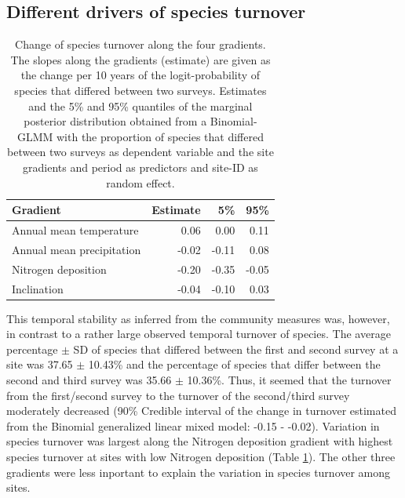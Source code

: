 \documentclass[fleqn,10pt,lineno]{wlpeerj} %
\theoremstyle{definition}
\theoremstyle{definition}
\theoremstyle{definition}
\theoremstyle{remark}
\begin{document}
\subsection*{Different drivers of species
turnover}\label{different-drivers-of-species-turnover}

\begin{table}

\caption{\label{tab:turnovertab}Change of species turnover along the four gradients. The slopes along the gradients (estimate) are given as the change per 10 years of the logit-probability of species that differed between two surveys. Estimates and the 5\% and 95\% quantiles of the marginal posterior distribution obtained from a Binomial-GLMM with the proportion of species that differed between two surveys as dependent variable and the site gradients and period as predictors and site-ID as random effect.}
\centering
\begin{tabular}[t]{lrrr}
\toprule
Gradient & Estimate & 5\% & 95\%\\
\midrule
Annual mean temperature & 0.06 & 0.00 & 0.11\\
Annual mean precipitation & -0.02 & -0.11 & 0.08\\
Nitrogen deposition & -0.20 & -0.35 & -0.05\\
Inclination & -0.04 & -0.10 & 0.03\\
\bottomrule
\end{tabular}
\end{table}

This temporal stability as inferred from the community measures was,
however, in contrast to a rather large observed temporal turnover of
species. The average percentage \(\pm\) SD of species that differed
between the first and second survey at a site was 37.65 \(\pm\) 10.43\%
and the percentage of species that differ between the second and third
survey was 35.66 \(\pm\) 10.36\%. Thus, it seemed that the turnover from
the first/second survey to the turnover of the second/third survey
moderately decreased (90\% Credible interval of the change in turnover
estimated from the Binomial generalized linear mixed model: -0.15 -
-0.02). Variation in species turnover was largest along the Nitrogen
deposition gradient with highest species turnover at sites with low
Nitrogen deposition (Table \ref{tab:turnovertab}). The other three
gradients were less inportant to explain the variation in species
turnover among sites.
\end{document}
